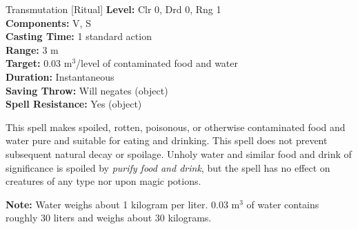 {Transmutation [Ritual]}
{
	\textbf{Level:}
	Clr 0, Drd 0, Rng 1\\
	\textbf{Components:}
	V, S\\
	\textbf{Casting Time:}
	1 standard action\\
	\textbf{Range:}
	3 m\\
	\textbf{Target:}
	0.03 m$^3$/level of contaminated food and water\\
	\textbf{Duration:}
	Instantaneous\\
	\textbf{Saving Throw:}
	Will negates (object)\\
	\textbf{Spell Resistance:}
	Yes (object)\\
}
{
	This spell makes spoiled, rotten, poisonous, or otherwise contaminated food and water pure and suitable for eating and drinking. This spell does not prevent subsequent natural decay or spoilage. Unholy water and similar food and drink of significance is spoiled by \emph{purify food and drink}, but the spell has no effect on creatures of any type nor upon magic potions.

	\textbf{Note:} Water weighs about 1 kilogram per liter. 0.03 m$^3$ of water contains roughly 30 liters and weighs about 30 kilograms.

}
